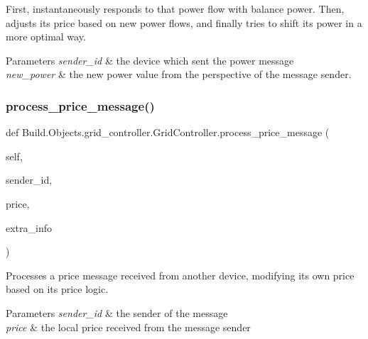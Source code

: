 First, instantaneously responds to that power flow with balance power. Then, adjusts its price based on new power flows, and finally tries to shift its power in a more optimal way. 
\begin{DoxyParams}{Parameters}
{\em sender\+\_\+id} & the device which sent the power message \\
\hline
{\em new\+\_\+power} & the new power value from the perspective of the message sender. \\
\hline
\end{DoxyParams}
\mbox{\label{class_build_1_1_objects_1_1grid__controller_1_1_grid_controller_a7133aa43a9d19e42fad9c6deca385fe2}} 
\subsubsection{\texorpdfstring{process\+\_\+price\+\_\+message()}{process\_price\_message()}}
{\footnotesize\ttfamily def Build.\+Objects.\+grid\+\_\+controller.\+Grid\+Controller.\+process\+\_\+price\+\_\+message (\begin{DoxyParamCaption}\item[{}]{self,  }\item[{}]{sender\+\_\+id,  }\item[{}]{price,  }\item[{}]{extra\+\_\+info }\end{DoxyParamCaption})}



Processes a price message received from another device, modifying its own price based on its price logic. 


\begin{DoxyParams}{Parameters}
{\em sender\+\_\+id} & the sender of the message \\
\hline
{\em price} & the local price received from the message sender \\
\hline
\end{DoxyParams}
\mbox{\label{class_build_1_1_objects_1_1grid__controller_1_1_grid_controller_aedf7e56f24b97d1fa1d4ff68d23cd987}} 
